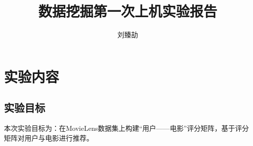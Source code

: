 

\title{数据挖掘第一次上机实验报告}
\author{刘臻劼}


\clearpage
\tableofcontents
\pagestyle{preContent}

\clearpage
\section{实验内容}
\subsection{实验目标}
\xiaosi\begin{spacing}{1.5} 本次实验目标为：在MovieLens数据集上构建“用户——电影”评分矩阵，基于评分矩阵对用户与电影进行推荐。
\end{spacing}
